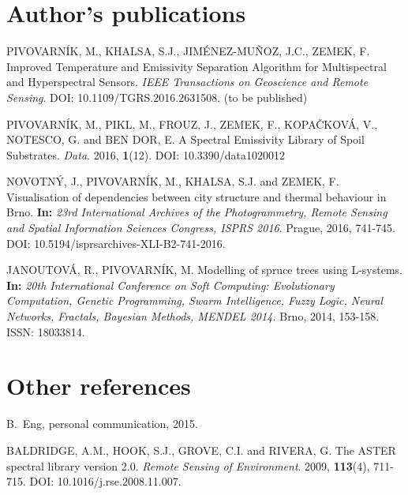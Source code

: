 \begin{thebibliography}{10}


\section*{Author’s publications}

 PIVOVARNÍK, M., KHALSA, S.J., JIMÉNEZ-MUÑOZ, J.C., ZEMEK, F. Improved Temperature and Emissivity Separation Algorithm for Multispectral and Hyperspectral Sensors. \textit{IEEE Transactions on Geoscience and Remote Sensing}. DOI: 10.1109/TGRS.2016.2631508. (to be published)

 PIVOVARNÍK, M., PIKL, M., FROUZ, J., ZEMEK, F., KOPAČKOVÁ, V., NOTESCO, G. and BEN DOR, E. A Spectral Emissivity Library of Spoil Substrates. \textit{Data}. 2016, \textbf{1}(12). DOI: 10.3390/data1020012

 NOVOTNÝ, J., PIVOVARNÍK, M., KHALSA, S.J. and ZEMEK, F. Visualisation of dependencies between city structure and thermal behaviour in Brno. \textbf{In:} \textit{23rd International Archives of the Photogrammetry, Remote Sensing and Spatial Information Sciences Congress, ISPRS 2016}. Prague, 2016, 741-745. DOI: 10.5194/isprsarchives-XLI-B2-741-2016.

 JANOUTOVÁ, R., PIVOVARNÍK, M. Modelling of spruce trees using L-systems. \textbf{In:} \textit{20th International Conference on Soft Computing: Evolutionary Computation, Genetic Programming, Swarm Intelligence, Fuzzy Logic, Neural Networks, Fractals, Bayesian Methods, MENDEL 2014.} Brno, 2014, 153-158. ISSN: 18033814.


\section*{Other references}


B.~Eng, personal communication, 2015.

 BALDRIDGE, A.M., HOOK, S.J., GROVE, C.I. and RIVERA, G. The ASTER spectral library version 2.0. \textit{Remote Sensing of Environment}. 2009, \textbf{113}(4), 711-715. DOI: 10.1016/j.rse.2008.11.007.


\end{thebibliography}
